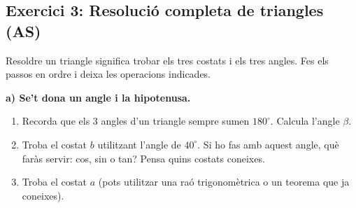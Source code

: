 \documentclass[12pt,a4paper]{article}
\begin{document}
\subsection*{Exercici 3: Resolució completa de triangles (AS)}
Resoldre un triangle significa trobar els tres costats i els tres angles. Fes els passos en ordre i deixa les operacions indicades.

\vspace{0.3cm}
\textbf{a) Se't dona un angle i la hipotenusa.} \\
\begin{minipage}{0.45\textwidth}
\end{minipage}
\begin{minipage}{0.5\textwidth}
    \begin{enumerate}
        \item Recorda que els 3 angles d'un triangle sempre sumen $180^\circ$. Calcula l'angle $\beta$.
        \vspace{1cm}
        \item Troba el costat $b$ utilitzant l'angle de $40^\circ$. Si ho fas amb aquest angle, què faràs servir: cos, sin o tan? Pensa quins costats coneixes.
        \vspace{1.5cm}
        \item Troba el costat $a$ (pots utilitzar una raó trigonomètrica o un teorema que ja coneixes).
        \vspace{2cm}
    \end{enumerate}
\end{minipage}
\end{document}
